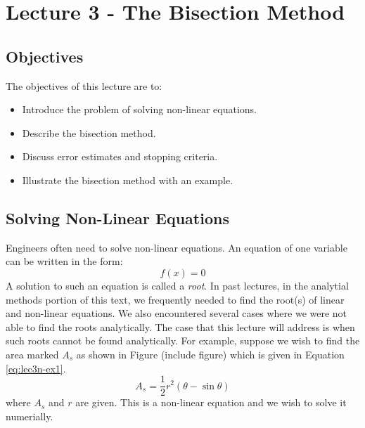 \chapter{Lecture 3 - The Bisection Method}
\label{ch:lec3n}
\section{Objectives}
The objectives of this lecture are to:
\begin{itemize}
\item Introduce the problem of solving non-linear equations.
\item Describe the bisection method.
\item Discuss error estimates and stopping criteria.
\item Illustrate the bisection method with an example.
\end{itemize}
\setcounter{lstannotation}{0}

\section{Solving Non-Linear Equations}
Engineers often need to solve non-linear equations.  An equation of one variable can be written in the form:
\begin{equation}
f(x) = 0
\end{equation}
A solution to such an equation is called a \emph{root}.  In past lectures, in the analytial methods portion of this text, we frequently needed to find the root(s) of linear and non-linear equations.  We also encountered several cases where we were not able to find the roots analytically.
The case that this lecture will address is when such roots cannot be found analytically.  For example, suppose we wish to find the area marked $A_s$ as shown in Figure (include figure) which is given in Equation \ref{eq:lec3n-ex1}.
\begin{equation}
A_s = \frac{1}{2}r^2\left(\theta - \sin{\theta}\right)
\label{eq:lec3n-ex1}
\end{equation}
where $A_s$ and $r$ are given.  This is a non-linear equation and we wish to solve it numerially.

